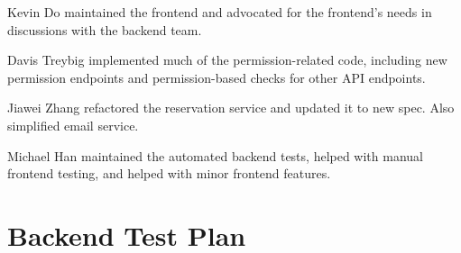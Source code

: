 \documentclass[12pt]{article}
\begin{document}
Kevin Do maintained the frontend and advocated for the frontend's needs in discussions with the backend team.

Davis Treybig implemented much of the permission-related code, including new permission endpoints and permission-based checks for other API endpoints. 

Jiawei Zhang refactored the reservation service and updated it to new spec. Also simplified email service.

Michael Han maintained the automated backend tests, helped with manual frontend testing, and helped with minor frontend features.

\clearpage
\appendix
\section{Backend Test Plan}
\label{appendix:backendtest}
\end{document}
